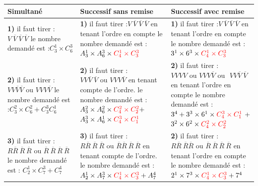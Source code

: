 \documentclass[12pt,a4paper]{article}
\begin{document}
\raggedright
\begin{tabular}{|p{6cm}|p{6cm}|p{5cm}|}
\hline
\textbf{Simultané} & \textbf{Successif sans remise} & \textbf{Successif avec remise}\\
\hline
\makecell[l]{\textbf{1)} il faut tirer : $V \ \overline{V} \ \overline{V} \ \overline{V}$\\ le nombre demandé est :$C_3^1 \times C_6^3 $} & \makecell[l]{\textbf{1)} il faut tirer :$ V \ \overline{V} \ \overline{V} \ \overline{V}$\\ en tenant l'ordre en compte\\ le nombre demandé est :$ A_3^1 \times A_6^3 \times \color{red} C_4^1 \times C_3^3$} & \makecell[l]{\textbf{1)} il faut tirer :$ V \ \overline{V} \ \overline{V} \ \overline{V}$\\ en tenant l'ordre en compte\\ le nombre demandé est :$ 3^1 \times 6^3 \times \color{red} C_4^1 \times C_3^3 $} \\
\hline
\makecell[l]{\textbf{2)} il faut tirer :\\ $V V \overline{V} \overline{V} \text{ ou } V V V \overline{V}$\\ le nombre demandé est :$ C_3^2 \times C_6^2 + C_3^3 C_6^1 $} & \makecell[l]{\textbf{2)} il faut tirer : $V V \overline{V} \ \overline{V} \text{ ou } V V V \overline{V}$\\ en tenant compte de l'ordre.\\ le nombre demandé est :$ A_3^2 \times A_6^2 \times \color{red} C_4^2 \times C_2^2 \color{black} +$ \\$ A_3^3 \times A_6^1 \times \color{red} C_4^3 \times C_1^1 $} & \makecell[l]{\textbf{2)} il faut tirer :\\$ V V V V \text{ ou } V V V \overline{V} \text{ ou }$ $ V V \overline{V} \ \overline{V} $\\ en tenant l'ordre en compte\\ le nombre demandé est : $ 3^4 + 3^3 \times 6^1 \times \color{red} C_4^3 \times C_1^1 \color{black}$\\ + $3^2 \times 6^2 \times \color{red} C_4^2 \times C_2^2$} \\
\hline
\makecell[l]{\textbf{3)} il faut tirer : $R \overline{R} \ \overline{R} \ \overline{R} \text{ ou } \overline{R} \ \overline{R} \ \overline{R} \ \overline{R}$\\ le nombre demandé est : $ C_2^1 \times C_7^3 + C_7^4 $} & \makecell[l]{\textbf{3)} il faut tirer : $R \overline{R} \ \overline{R} \ \overline{R} \text{ ou } \overline{R} \overline{R} \ \overline{R} \ \overline{R}$\\ en tenant compte de l'ordre.\\ le nombre demandé est :$ A_2^1 \times A_7^3 \times \color{red} C_4^1 \times C_3^3 \color{black} + A_7^4$} & \makecell[l]{\textbf{2)} il faut tirer : $ R \overline{R} \ \overline{R} \overline{R} \text{ ou } \overline{R} \ \overline{R} \ \overline{R} \ \overline{R} $\\ en tenant l'ordre en compte\\ le nombre demandé est :$ 2^1 \times 7^3 \times \color{red} C_4^1 \times C_3^3 \color{black} + 7^4$} \\

\end{tabular}
\end{document}
